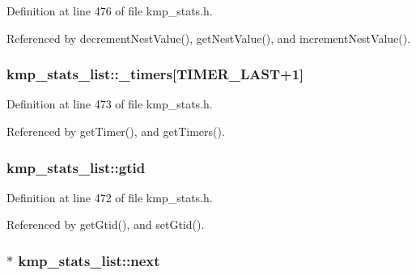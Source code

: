 Definition at line 476 of file kmp\-\_\-stats.\-h.



Referenced by decrement\-Nest\-Value(), get\-Nest\-Value(), and increment\-Nest\-Value().

\hypertarget{classkmp__stats__list_a2624345c5644d6c9e463ab997f99de8f}{
\subsubsection[{\-\_\-timers}]{ kmp\-\_\-stats\-\_\-list\-::\-\_\-timers\mbox{[}T\-I\-M\-E\-R\-\_\-\-L\-A\-S\-T+1\mbox{]}\hspace{0.3cm}{\ttfamily [private]}}}\label{classkmp__stats__list_a2624345c5644d6c9e463ab997f99de8f}


Definition at line 473 of file kmp\-\_\-stats.\-h.



Referenced by get\-Timer(), and get\-Timers().

\hypertarget{classkmp__stats__list_a18c3971024dbebaaeb981747c0bfa34a}{
\subsubsection[{gtid}]{ kmp\-\_\-stats\-\_\-list\-::gtid\hspace{0.3cm}{\ttfamily [private]}}}\label{classkmp__stats__list_a18c3971024dbebaaeb981747c0bfa34a}


Definition at line 472 of file kmp\-\_\-stats.\-h.



Referenced by get\-Gtid(), and set\-Gtid().

\hypertarget{classkmp__stats__list_ae032b64486b967b266e1c524f993995e}{
\subsubsection[{next}]{$\ast$ kmp\-\_\-stats\-\_\-list\-::next\hspace{0.3cm}{\ttfamily [private]}}}\label{classkmp__stats__list_ae032b64486b967b266e1c524f993995e}


